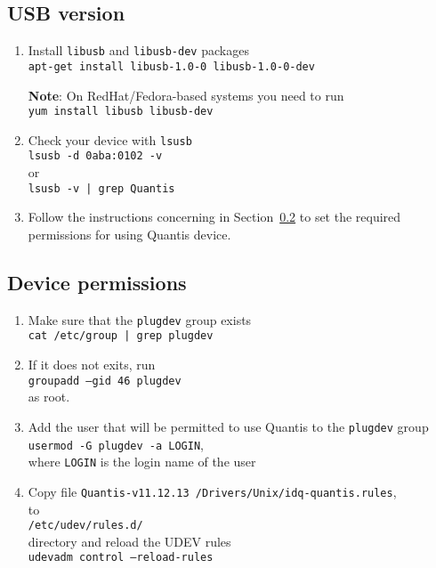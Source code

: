 \documentclass[a4paper,11pt]{article}
\providecommand{\note}[1]{\vspace{6pt}\noindent\textbf{Note}: #1\vspace{6pt}}
\newcommand{\QuantisDistVersion}{Quantis-v11.12.13}
\begin{document}
\subsection{USB version}\label{sec:usb-version}
\begin{enumerate}
    \item Install \texttt{libusb} and \texttt{libusb-dev} packages\\ 
    \texttt{apt-get install libusb-1.0-0 libusb-1.0-0-dev}

    \note{On RedHat/Fedora-based systems you need to run}\\
    \texttt{yum install libusb libusb-dev}

    \item Check your device with \texttt{lsusb}\\
    \texttt{lsusb -d 0aba:0102 -v}\\ or\\ \texttt{lsusb -v | grep Quantis}

    \item Follow the instructions concerning in Section~\ref{sec:permissions} to
    set the required permissions for using Quantis device.
\end{enumerate}


\subsection{Device permissions}\label{sec:permissions}
\begin{enumerate}
    \item Make sure that the \texttt{plugdev} group exists\\
    \texttt{cat /etc/group | grep plugdev}
    \item If it does not exits, run\\ 
    \texttt{groupadd --gid 46 plugdev}\\
    as root.
    \item Add the user that will be permitted to use Quantis to the
    \texttt{plugdev} group\\ \texttt{usermod -G plugdev -a LOGIN},\\ where
    \texttt{LOGIN} is the login name of the user
    \item Copy file \texttt{\QuantisDistVersion
    /Drivers/Unix/idq-quantis.rules},\\ to\\ \texttt{/etc/udev/rules.d/}\\ directory
    and reload the UDEV rules\\ \texttt{udevadm control --reload-rules}
\end{enumerate}
\end{document}
